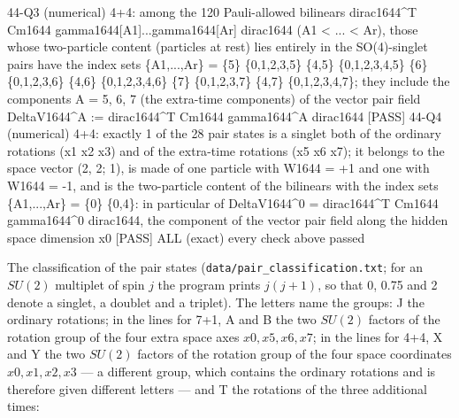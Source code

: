 \documentclass[
  10pt,
]{article}
\newenvironment{Shaded}{}{}
\newcommand{\NormalTok}[1]{#1}
\begin{document}
\begin{Shaded}
\begin{Highlighting}[]
\NormalTok{[PASS] 44{-}Q3  (numerical) 4+4: among the 120 Pauli{-}allowed bilinears dirac1644\^{}T Cm1644 gamma1644[A1]...gamma1644[Ar] dirac1644 (A1 \textless{} ... \textless{} Ar), those whose two{-}particle content (particles at rest) lies entirely in the SO(4){-}singlet pairs have the index sets \{A1,...,Ar\} = \{5\} \{0,1,2,3,5\} \{4,5\} \{0,1,2,3,4,5\} \{6\} \{0,1,2,3,6\} \{4,6\} \{0,1,2,3,4,6\} \{7\} \{0,1,2,3,7\} \{4,7\} \{0,1,2,3,4,7\}; they include the components A = 5, 6, 7 (the extra{-}time components) of the vector pair field DeltaV1644\^{}A := dirac1644\^{}T Cm1644 gamma1644\^{}A dirac1644}
\NormalTok{[PASS] 44{-}Q4  (numerical) 4+4: exactly 1 of the 28 pair states is a singlet both of the ordinary rotations (x1 x2 x3) and of the extra{-}time rotations (x5 x6 x7); it belongs to the space vector (2, 2; 1), is made of one particle with W1644 = +1 and one with W1644 = {-}1, and is the two{-}particle content of the bilinears with the index sets \{A1,...,Ar\} = \{0\} \{0,4\}: in particular of DeltaV1644\^{}0 = dirac1644\^{}T Cm1644 gamma1644\^{}0 dirac1644, the component of the vector pair field along the hidden space dimension x0}
\NormalTok{[PASS] ALL    (exact) every check above passed}
\end{Highlighting}
\end{Shaded}

The classification of the pair states
(\texttt{data/pair\_classification.txt}; for an \(SU(2)\) multiplet of
spin \(j\) the program prints \(j(j+1)\), so that 0, 0.75 and 2 denote a
singlet, a doublet and a triplet). The letters name the groups: J the
ordinary rotations; in the lines for 7+1, A and B the two \(SU(2)\)
factors of the rotation group of the four extra space axes
\(x0,x5,x6,x7\); in the lines for 4+4, X and Y the two \(SU(2)\) factors
of the rotation group of the four space coordinates \(x0,x1,x2,x3\) ---
a different group, which contains the ordinary rotations and is
therefore given different letters --- and T the rotations of the three
additional times:
\end{document}
